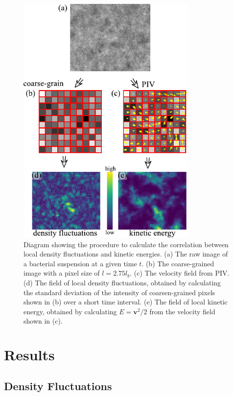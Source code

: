 \begin{figure}[!]
	\begin{center}
		\includegraphics[width=3.5in]{Figs/5-GNF/local-correlation.pdf}
		\caption[Local Correlation between Density Fluctuations and Kinetic Energies]
		{
			Diagram showing the procedure to calculate the correlation between local density fluctuations and kinetic energies. (a) The raw image of a bacterial suspension at a given time $t$. (b) The coarse-grained image with a pixel size of $l=2.75l_b$. (c) The velocity field from PIV. (d) The field of local density fluctuations, obtained by calculating the standard deviation of the intensity of coarsen-grained pixels shown in (b) over a short time interval. (e) The field of local kinetic energy, obtained by calculating $E = \bm{v}^2/2$ from the velocity field shown in (c).
 		}
		\label{fig:coupling-calculation}
	\end{center}
\end{figure}





\section{Results}
\subsection{Density Fluctuations}


